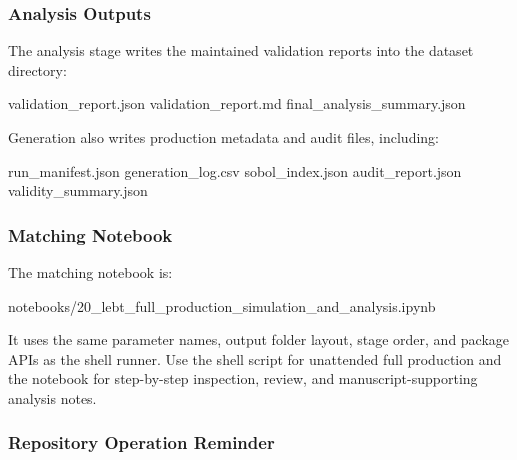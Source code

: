 \documentclass[
]{article}
\newenvironment{Shaded}{}{}
\newcommand{\NormalTok}[1]{#1}
\begin{document}
\hypertarget{analysis-outputs}{%
\subsubsection{Analysis Outputs}\label{analysis-outputs}}

The analysis stage writes the maintained validation reports into the
dataset directory:

\begin{Shaded}
\begin{Highlighting}[]
\NormalTok{validation\_report.json}
\NormalTok{validation\_report.md}
\NormalTok{final\_analysis\_summary.json}
\end{Highlighting}
\end{Shaded}

Generation also writes production metadata and audit files, including:

\begin{Shaded}
\begin{Highlighting}[]
\NormalTok{run\_manifest.json}
\NormalTok{generation\_log.csv}
\NormalTok{sobol\_index.json}
\NormalTok{audit\_report.json}
\NormalTok{validity\_summary.json}
\end{Highlighting}
\end{Shaded}

\hypertarget{matching-notebook}{%
\subsubsection{Matching Notebook}\label{matching-notebook}}

The matching notebook is:

\begin{Shaded}
\begin{Highlighting}[]
\NormalTok{notebooks/20\_lebt\_full\_production\_simulation\_and\_analysis.ipynb}
\end{Highlighting}
\end{Shaded}

It uses the same parameter names, output folder layout, stage order, and
package APIs as the shell runner. Use the shell script for unattended
full production and the notebook for step-by-step inspection, review,
and manuscript-supporting analysis notes.

\hypertarget{repository-operation-reminder}{%
\subsubsection{Repository Operation
Reminder}\label{repository-operation-reminder}}
\end{document}
